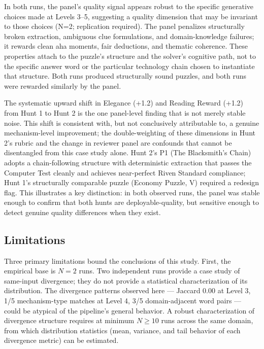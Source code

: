 In both runs, the panel's quality signal appears robust to the specific generative choices made at Levels 3--5, suggesting a quality dimension that may be invariant to those choices (N=2; replication required). The panel penalizes structurally broken extraction, ambiguous clue formulations, and domain-knowledge failures; it rewards clean aha moments, fair deductions, and thematic coherence. These properties attach to the puzzle's structure and the solver's cognitive path, not to the specific answer word or the particular technology chain chosen to instantiate that structure. Both runs produced structurally sound puzzles, and both runs were rewarded similarly by the panel.

The systematic upward shift in Elegance (+1.2) and Reading Reward (+1.2) from Hunt 1 to Hunt 2 is the one panel-level finding that is not merely stable noise. This shift is consistent with, but not conclusively attributable to, a genuine mechanism-level improvement; the double-weighting of these dimensions in Hunt 2's rubric and the change in reviewer panel are confounds that cannot be disentangled from this case study alone. Hunt 2's P1 (The Blacksmith's Chain) adopts a chain-following structure with deterministic extraction that passes the Computer Test cleanly and achieves near-perfect Riven Standard compliance; Hunt 1's structurally comparable puzzle (Economy Puzzle, V) required a redesign flag. This illustrates a key distinction: in both observed runs, the panel was stable enough to confirm that both hunts are deployable-quality, but sensitive enough to detect genuine quality differences when they exist.

\subsection{Limitations}

Three primary limitations bound the conclusions of this study. First, the empirical base is $N = 2$ runs. Two independent runs provide a case study of same-input divergence; they do not provide a statistical characterization of its distribution. The divergence patterns observed here --- Jaccard 0.00 at Level 3, 1/5 mechanism-type matches at Level 4, 3/5 domain-adjacent word pairs --- could be atypical of the pipeline's general behavior. A robust characterization of divergence structure requires at minimum $N \geq 10$ runs across the same domain, from which distribution statistics (mean, variance, and tail behavior of each divergence metric) can be estimated.

